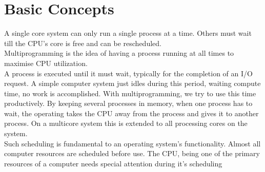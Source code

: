 \documentclass[oneside]{book}
\begin{document}
        \section{Basic Concepts}
            A single core system can only run a single process at a time. Others must wait
            till the CPU's core is free and can be rescheduled.\\
            Multiprogramming is the idea of having a process running at all times to maximise
            CPU utilization.\\
            A process is executed until it must wait, typically for the completion of an I/O 
            request. A simple computer system just idles during this period, waiting compute time,
            no work is accomplished. With multiprogramming, we try to use this time productively.
            By keeping several processes in memory, when one process has to wait, the operating takes 
            the CPU away from the process and gives it to another process. On a multicore system this
            is extended to all processing cores on the system.\\
            Such scheduling is fundamental to an operating system's functionality. Almost all 
            computer resources are scheduled before use. The CPU, being one of the primary resources
            of a computer needs special attention during it's scheduling
\end{document}
